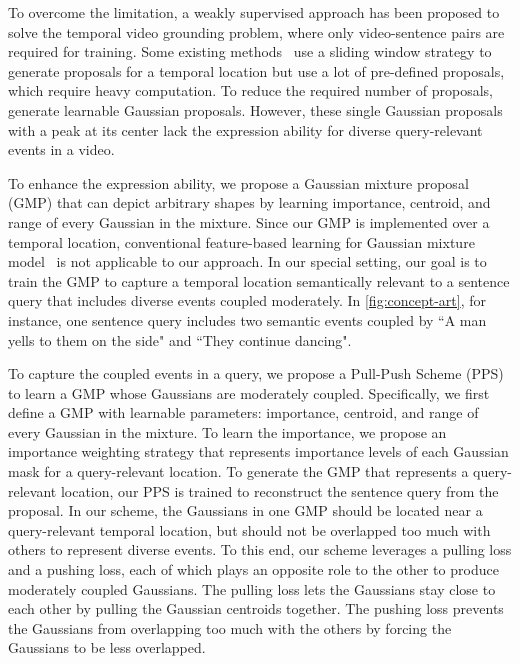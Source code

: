 To overcome the limitation, a weakly supervised approach has been proposed to solve the temporal video grounding problem, where only video-sentence pairs are required for training. 
Some existing methods~\cite{huang2021cross, lin2020weakly, mithun2019weakly, tan2021logan, wang2021weakly, zhang2020counterfactual} use a sliding window strategy to generate proposals for a temporal location but use a lot of pre-defined proposals, which require heavy computation.
To reduce the required number of proposals, \cite{zheng2022cnm, zheng2022cpl} generate learnable Gaussian proposals. 
However, these single Gaussian proposals with a peak at its center lack the expression ability for diverse query-relevant events in a video.

To enhance the expression ability, we propose a Gaussian mixture proposal (GMP) that can depict arbitrary shapes by learning importance, centroid, and range of every Gaussian in the mixture.
Since our GMP is implemented over a temporal location, conventional feature-based learning for Gaussian mixture model~\cite{zong2018deep, lee2018simple} is not applicable to our approach.
In our special setting, our goal is to train the GMP to capture a temporal location semantically %
relevant to a sentence query that includes diverse events coupled moderately. %
In \cref{fig:concept-art}, for instance, one sentence query includes two semantic events coupled by ``A man yells to them on the side" and ``They continue dancing".

To capture the %
coupled events in a query, we propose a Pull-Push Scheme (PPS) to learn a GMP whose Gaussians are moderately coupled.
Specifically, we first define a GMP with learnable parameters: importance, centroid, and range of every Gaussian in the mixture.
To learn the importance, we propose an importance weighting strategy that represents importance levels of each Gaussian mask for a query-relevant location.
To generate the GMP that represents a query-relevant location, our PPS is trained to reconstruct the sentence query from the proposal.
In our scheme, the Gaussians in one GMP should be located near a query-relevant temporal location, 
but should not be overlapped too much with others to represent diverse events.
To this end, our scheme leverages a pulling loss and a pushing loss, each of which plays an opposite role to the other to produce moderately coupled Gaussians.
The pulling loss lets the Gaussians stay close to each other by pulling the Gaussian centroids together.
The pushing loss prevents the Gaussians from overlapping too much with the others by forcing the Gaussians to be less overlapped.

